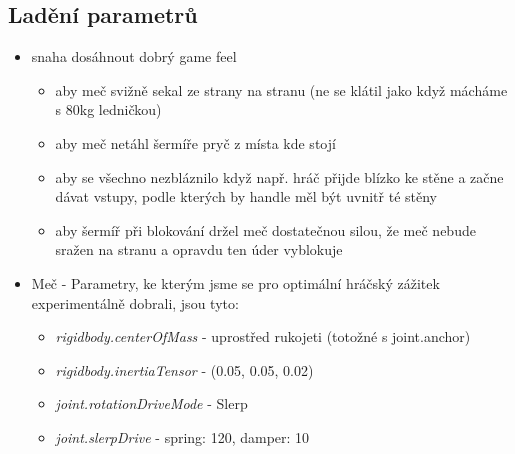 \subsection{Ladění parametrů} \label{swordParameterTweaksSection}
\begin{itemize}
  \item snaha dosáhnout dobrý game feel
    \begin{itemize}
      \item aby meč svižně sekal ze strany na stranu (ne se klátil jako když mácháme s 80kg ledničkou)
      \item aby meč netáhl šermíře pryč z místa kde stojí
      \item aby se všechno nezbláznilo když např. hráč přijde blízko ke stěne a začne dávat vstupy, podle kterých by handle měl být uvnitř té stěny
      \item aby šermíř při blokování držel meč dostatečnou silou, že meč nebude sražen na stranu a opravdu ten úder vyblokuje 
    \end{itemize}

  \item Meč - Parametry, ke kterým jsme se pro optimální hráčský zážitek experimentálně dobrali, jsou tyto: 
    \begin{itemize}
      \item \textit{rigidbody.centerOfMass} - uprostřed rukojeti (totožné s joint.anchor)
      \item \textit{rigidbody.inertiaTensor} - (0.05, 0.05, 0.02)
      \item \textit{joint.rotationDriveMode} - Slerp
      \item \textit{joint.slerpDrive} - spring: 120, damper: 10
    \end{itemize}
    

\end{itemize}
